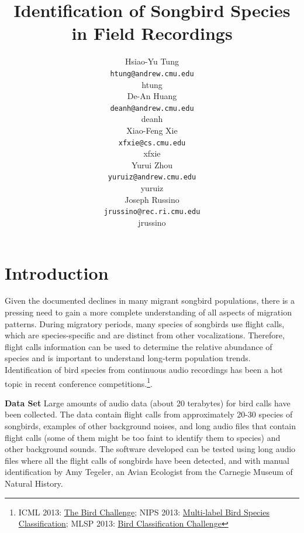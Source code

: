 \documentclass{article} %
\title{Identification of Songbird Species in Field Recordings
}
\author{
Hsiao-Yu Tung \\
\texttt{htung@andrew.cmu.edu} \\
htung \\
\And
De-An Huang \\
\texttt{deanh@andrew.cmu.edu} \\
deanh \\
\And
Xiao-Feng Xie \\
\texttt{xfxie@cs.cmu.edu} \\
xfxie \\
\And
Yurui Zhou\\
\texttt{yuruiz@andrew.cmu.edu}\\
yuruiz \\
\And
Joseph Russino\\
\texttt{jrussino@rec.ri.cmu.edu}\\
jrussino \\
}
\begin{document}
\maketitle

\begin{abstract}
\end{abstract}

\section{Introduction}
Given the documented declines in many migrant songbird populations, there is a pressing need to gain a more complete understanding of all aspects of migration patterns.
During migratory periods, many species of songbirds use flight calls, which are species-specific and are distinct from other vocalizations. Therefore, flight calls information can be used to determine the relative abundance of species and is important to understand long-term population trends. Identification of bird species from continuous audio recordings has been a hot topic in recent conference competitions.\footnote{\scriptsize ICML 2013: \href{http://www.kaggle.com/c/the-icml-2013-bird-challenge}{The Bird Challenge}; NIPS 2013: \href{http://www.kaggle.com/c/multilabel-bird-species-classification-nips2013}{
Multi-label Bird Species Classification}; MLSP 2013: \href{http://www.kaggle.com/c/mlsp-2013-birds}{Bird Classification Challenge}}.


{\bf Data Set} Large amounts of audio data (about 20 terabytes) for bird calls have been collected. The data contain flight calls from approximately 20-30 species of songbirds, examples of other background noises, and long audio files that contain flight calls (some of them might be too faint to identify them to species) and other background sounds. The software developed can be tested using long audio files where all the flight calls of songbirds have been detected, and with manual identification by Amy Tegeler, an Avian Ecologist from the Carnegie Museum of Natural History.
\end{document}
